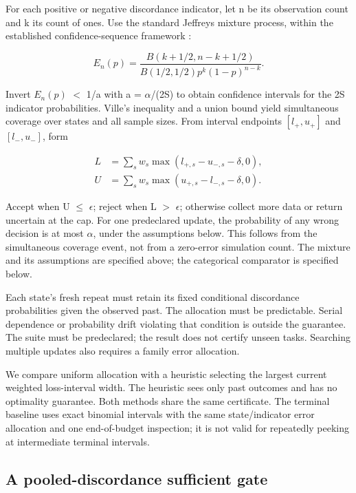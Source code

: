 \documentclass[conference]{IEEEtran}
\begin{document}
For each positive or negative discordance indicator, let n be its observation count and k its count of ones. Use the standard Jeffreys mixture process, within the established confidence-sequence framework \cite{howard}:

\begin{equation}
E_n(p)=\frac{B(k+1/2,n-k+1/2)}
 {B(1/2,1/2)p^k(1-p)^{n-k}}.
\end{equation}

Invert $E_n(p)$ $<$ 1/a with a = $\alpha$/(2S) to obtain confidence intervals for the 2S indicator probabilities. Ville's inequality and a union bound yield simultaneous coverage over states and all sample sizes. From interval endpoints $[l_+,u_+]$ and $[l_-,u_-]$, form

\begin{align}
L&=\sum_s w_s\max(l_{+,s}-u_{-,s}-\delta,0),\\
U&=\sum_s w_s\max(u_{+,s}-l_{-,s}-\delta,0).
\end{align}

Accept when U $\leq$ $\epsilon$; reject when L $>$ $\epsilon$; otherwise collect more data or return uncertain at the cap. For one predeclared update, the probability of any wrong decision is at most $\alpha$, under the assumptions below. This follows from the simultaneous coverage event, not from a zero-error simulation count. The mixture and its assumptions are specified above; the categorical comparator is specified below.

Each state's fresh repeat must retain its fixed conditional discordance probabilities given the observed past. The allocation must be predictable. Serial dependence or probability drift violating that condition is outside the guarantee. The suite must be predeclared; the result does not certify unseen tasks. Searching multiple updates also requires a family error allocation.

We compare uniform allocation with a heuristic selecting the largest current weighted loss-interval width. The heuristic sees only past outcomes and has no optimality guarantee. Both methods share the same certificate. The terminal baseline uses exact binomial intervals with the same state/indicator error allocation and one end-of-budget inspection; it is not valid for repeatedly peeking at intermediate terminal intervals.

\subsection{A pooled-discordance sufficient gate}
\end{document}
